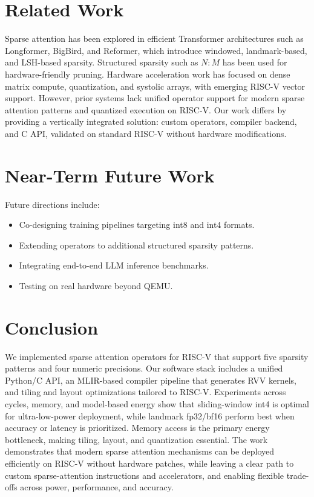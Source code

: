 \documentclass[10pt,conference]{IEEEtran}
\begin{document}
\section{Related Work}
Sparse attention has been explored in efficient Transformer architectures such as Longformer, BigBird, and Reformer, which introduce windowed, landmark-based, and LSH-based sparsity. Structured sparsity such as $N\!:\!M$ has been used for hardware-friendly pruning.
Hardware acceleration work has focused on dense matrix compute, quantization, and systolic arrays, with emerging RISC-V vector support. However, prior systems lack unified operator support for modern sparse attention patterns and quantized execution on RISC-V. Our work differs by providing a vertically integrated solution: custom operators, compiler backend, and C API, validated on standard RISC-V without hardware modifications.

\section{Near-Term Future Work}
Future directions include:
\begin{itemize}
    \item Co-designing training pipelines targeting int8 and int4 formats.
    \item Extending operators to additional structured sparsity patterns.
    \item Integrating end-to-end LLM inference benchmarks.
    \item Testing on real hardware beyond QEMU.
\end{itemize}

\section{Conclusion}
We implemented sparse attention operators for RISC-V that support five sparsity patterns and four numeric precisions. Our software stack includes a unified Python/C API, an MLIR-based compiler pipeline that generates RVV kernels, and tiling and layout optimizations tailored to RISC-V. Experiments across cycles, memory, and model-based energy show that sliding-window int4 is optimal for ultra-low-power deployment, while landmark fp32/bf16 perform best when accuracy or latency is prioritized. Memory access is the primary energy bottleneck, making tiling, layout, and quantization essential. The work demonstrates that modern sparse attention mechanisms can be deployed efficiently on RISC-V without hardware patches, while leaving a clear path to custom sparse-attention instructions and accelerators, and enabling flexible trade-offs across power, performance, and accuracy.



\end{document}
